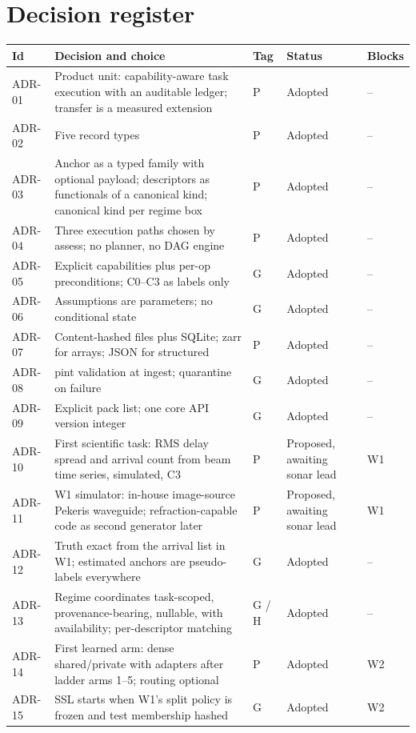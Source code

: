 \documentclass[11pt,a4paper]{article}
\begin{document}
\section{Decision register}

{\small
\begin{longtable}{@{}lp{7.4cm}lp{2.6cm}p{2cm}@{}}
\toprule
Id & Decision and choice & Tag & Status & Blocks \\
\midrule
\endhead
ADR-01 & Product unit: capability-aware task execution with an auditable ledger; transfer is a measured extension & P & Adopted & -- \\
ADR-02 & Five record types & P & Adopted & -- \\
ADR-03 & Anchor as a typed family with optional payload; descriptors as functionals of a canonical kind; canonical kind per regime box & P & Adopted & -- \\
ADR-04 & Three execution paths chosen by assess; no planner, no DAG engine & P & Adopted & -- \\
ADR-05 & Explicit capabilities plus per-op preconditions; C0--C3 as labels only & G & Adopted & -- \\
ADR-06 & Assumptions are parameters; no conditional state & G & Adopted & -- \\
ADR-07 & Content-hashed files plus SQLite; zarr for arrays; JSON for structured & P & Adopted & -- \\
ADR-08 & pint validation at ingest; quarantine on failure & G & Adopted & -- \\
ADR-09 & Explicit pack list; one core API version integer & G & Adopted & -- \\
ADR-10 & First scientific task: RMS delay spread and arrival count from beam time series, simulated, C3 & P & Proposed, awaiting sonar lead & W1 \\
ADR-11 & W1 simulator: in-house image-source Pekeris waveguide; refraction-capable code as second generator later & P & Proposed, awaiting sonar lead & W1 \\
ADR-12 & Truth exact from the arrival list in W1; estimated anchors are pseudo-labels everywhere & G & Adopted & -- \\
ADR-13 & Regime coordinates task-scoped, provenance-bearing, nullable, with availability; per-descriptor matching & G / H & Adopted & -- \\
ADR-14 & First learned arm: dense shared/private with adapters after ladder arms 1--5; routing optional & P & Adopted & W2 \\
ADR-15 & SSL starts when W1's split policy is frozen and test membership hashed & G & Adopted & W2 \\

\end{longtable}}
\end{document}
